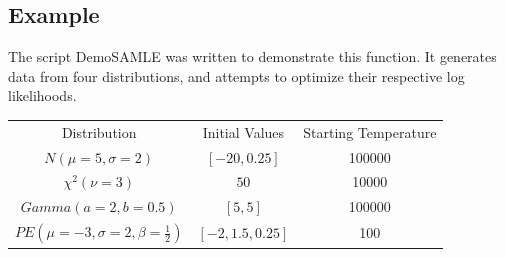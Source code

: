 \documentclass{book}
\newcommand{\textcode}[1]{\textsf{\small #1}}   %
\begin{document}
\subsection*{Example}

The script \textcode{DemoSAMLE} was written to demonstrate this
function. It generates data from four distributions, and
attempts to optimize their respective log likelihoods.

\begin{tabular}{ccc}
Distribution & Initial Values & Starting Temperature\\
$N\left(\mu=5,\sigma=2\right)$ & $\left[-20,0.25\right]$ & 100000\\
$\chi^2\left(\nu=3\right)$ & $50$ & 10000\\
$Gamma\left(a=2,b=0.5\right)$ & $\left[5,5\right]$ & 100000\\
$PE\left(\mu=-3,\sigma=2,\beta=\frac{1}{2}\right)$ & $\left[-2,1.5,0.25\right]$ & 100
\end{tabular}
\end{document}
